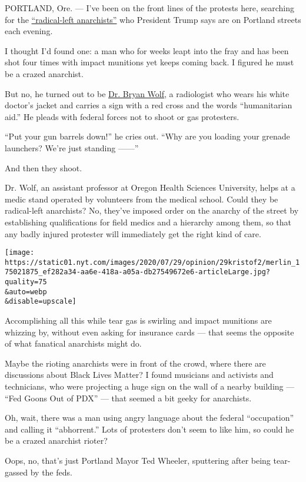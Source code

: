 PORTLAND, Ore. --- I've been on the front lines of the protests here,
searching for the
\href{https://twitter.com/realDonaldTrump/status/1287472054527197190}{``radical-left
anarchists''} who President Trump says are on Portland streets each
evening.

I thought I'd found one: a man who for weeks leapt into the fray and has
been shot four times with impact munitions yet keeps coming back. I
figured he must be a crazed anarchist.

But no, he turned out to be \href{https://twitter.com/BryanWolfPDX}{Dr.
Bryan Wolf}, a radiologist who wears his white doctor's jacket and
carries a sign with a red cross and the words ``humanitarian aid.'' He
pleads with federal forces not to shoot or gas protesters.

``Put your gun barrels down!'' he cries out. ``Why are you loading your
grenade launchers? We're just standing ------''

And then they shoot.

Dr. Wolf, an assistant professor at Oregon Health Sciences University,
helps at a medic stand operated by volunteers from the medical school.
Could they be radical-left anarchists? No, they've imposed order on the
anarchy of the street by establishing qualifications for field medics
and a hierarchy among them, so that any badly injured protester will
immediately get the right kind of care.

\texttt{[image: https://static01.nyt.com/images/2020/07/29/opinion/29kristof2/merlin\_175021875\_ef282a34-aa6e-418a-a05a-db27549672e6-articleLarge.jpg?quality=75\\\&auto=webp\\\&disable=upscale]}

Accomplishing all this while tear gas is swirling and impact munitions
are whizzing by, without even asking for insurance cards --- that seems
the opposite of what fanatical anarchists might do.

Maybe the rioting anarchists were in front of the crowd, where there are
discussions about Black Lives Matter? I found musicians and activists
and technicians, who were projecting a huge sign on the wall of a nearby
building --- ``Fed Goons Out of PDX'' --- that seemed a bit geeky for
anarchists.

Oh, wait, there was a man using angry language about the federal
``occupation'' and calling it ``abhorrent.'' Lots of protesters don't
seem to like him, so could he be a crazed anarchist rioter?

Oops, no, that's just Portland Mayor Ted Wheeler, sputtering after being
tear-gassed by the feds.

